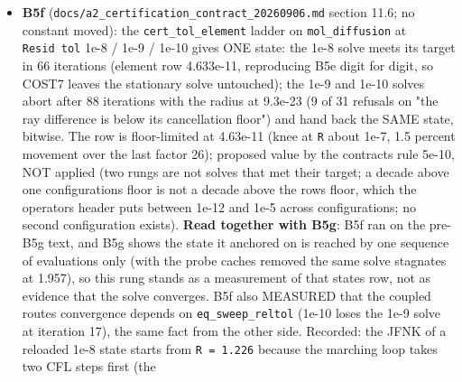 \documentclass[english,a4paper]{my_memo}
\begin{document}
\begin{itemize}
  refused where 31/18/18, GMRES truncations 18 -\textgreater{} 0, radius 8e-3 -\textgreater{} 2.05;
  \texttt{\textbar{}\textbar{}R\textbar{}\textbar{}} unchanged at 1.873 because the dogleg cuts steps by 2\^{}-25..2\^{}-49
  against the same bound from the trial side, a bound-constrained unknown
  space (decision, not repair). \texttt{cert\_tol\_carrier} UNCONFIRMED. Suites
  (advisor build): \texttt{steady\_species\_rows} 74/0 (88/0 with the self-test pair
  logs), \texttt{certification} 29/0, \texttt{coupled\_source\_step} 44/0, \texttt{carrier\_retry}
  100/0, \texttt{species\_face\_flux} green; advisor re-ran \texttt{wasp\_full\_newton} in full
  with the B5g binary: \texttt{Hydro\_ioniz.txt} and \texttt{Ion\_species.txt} IDENTICAL to
  the gate-3 output, CERTIFIED, log10 Mdot 13.30.
\item
  \textbf{B5f} (\texttt{docs/a2\_certification\_contract\_20260906.md} section 11.6; no
  constant moved): the \texttt{cert\_tol\_element} ladder on \texttt{mol\_diffusion} at
  \texttt{Resid\ tol} 1e-8 / 1e-9 / 1e-10 gives ONE state: the 1e-8 solve meets its
  target in 66 iterations (element row 4.633e-11, reproducing B5e digit for
  digit, so COST7 leaves the stationary solve untouched); the 1e-9 and
  1e-10 solves abort after 88 iterations with the radius at 9.3e-23 (9 of
  31 refusals on "the ray difference is below its cancellation floor") and
  hand back the SAME state, bitwise. The row is floor-limited at 4.63e-11
  (knee at \texttt{\textbar{}\textbar{}R\textbar{}\textbar{}} about 1e-7, 1.5 percent movement over the last factor
  26); proposed value by the contract\textquotesingle s rule 5e-10, NOT applied (two rungs
  are not solves that met their target; a decade above one configuration\textquotesingle s
  floor is not a decade above the row\textquotesingle s floor, which the operator\textquotesingle s header
  puts between 1e-12 and 1e-5 across configurations; no second
  configuration exists). \textbf{Read together with B5g}: B5f ran on the
  pre-B5g text, and B5g shows the state it anchored on is reached by one
  sequence of evaluations only (with the probe caches removed the same
  solve stagnates at 1.957), so this rung stands as a measurement of that
  state\textquotesingle s row, not as evidence that the solve converges. B5f also MEASURED
  that the coupled route\textquotesingle s convergence depends on \texttt{eq\_sweep\_reltol}
  (1e-10 loses the 1e-9 solve at iteration 17), the same fact from the
  other side. Recorded: the JFNK of a reloaded 1e-8 state starts from
  \texttt{\textbar{}\textbar{}R\textbar{}\textbar{}\ =\ 1.226} because the marching loop takes two CFL steps first (the

\end{itemize}
\end{document}
